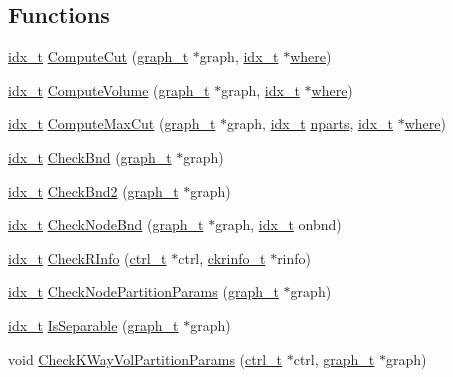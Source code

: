 \subsection*{Functions}
\begin{DoxyCompactItemize}
\item 
\hyperlink{a00876_aaa5262be3e700770163401acb0150f52}{idx\+\_\+t} \hyperlink{a00882_a99abc93df5d5bca5819ed55a767c4e0e}{Compute\+Cut} (\hyperlink{a00734}{graph\+\_\+t} $\ast$graph, \hyperlink{a00876_aaa5262be3e700770163401acb0150f52}{idx\+\_\+t} $\ast$\hyperlink{a00879_a7a355801f721e9d8d4ae03590a3a56b0}{where})
\item 
\hyperlink{a00876_aaa5262be3e700770163401acb0150f52}{idx\+\_\+t} \hyperlink{a00882_aedd132a5a97a0887c9ce0513ad903a7d}{Compute\+Volume} (\hyperlink{a00734}{graph\+\_\+t} $\ast$graph, \hyperlink{a00876_aaa5262be3e700770163401acb0150f52}{idx\+\_\+t} $\ast$\hyperlink{a00879_a7a355801f721e9d8d4ae03590a3a56b0}{where})
\item 
\hyperlink{a00876_aaa5262be3e700770163401acb0150f52}{idx\+\_\+t} \hyperlink{a00882_a2c579207b8d0c26ec7e5bebbdceaa73d}{Compute\+Max\+Cut} (\hyperlink{a00734}{graph\+\_\+t} $\ast$graph, \hyperlink{a00876_aaa5262be3e700770163401acb0150f52}{idx\+\_\+t} \hyperlink{a00879_aad88065af88fd6759101788a8e15ce9e}{nparts}, \hyperlink{a00876_aaa5262be3e700770163401acb0150f52}{idx\+\_\+t} $\ast$\hyperlink{a00879_a7a355801f721e9d8d4ae03590a3a56b0}{where})
\item 
\hyperlink{a00876_aaa5262be3e700770163401acb0150f52}{idx\+\_\+t} \hyperlink{a00882_addb0519d730bbc2793667e245d7de9b4}{Check\+Bnd} (\hyperlink{a00734}{graph\+\_\+t} $\ast$graph)
\item 
\hyperlink{a00876_aaa5262be3e700770163401acb0150f52}{idx\+\_\+t} \hyperlink{a00882_ad8de8465eafe229cfa7f0f51fd9d693f}{Check\+Bnd2} (\hyperlink{a00734}{graph\+\_\+t} $\ast$graph)
\item 
\hyperlink{a00876_aaa5262be3e700770163401acb0150f52}{idx\+\_\+t} \hyperlink{a00882_a1dc55b7020a40a70e39a3e179055c04f}{Check\+Node\+Bnd} (\hyperlink{a00734}{graph\+\_\+t} $\ast$graph, \hyperlink{a00876_aaa5262be3e700770163401acb0150f52}{idx\+\_\+t} onbnd)
\item 
\hyperlink{a00876_aaa5262be3e700770163401acb0150f52}{idx\+\_\+t} \hyperlink{a00882_adb0cfc48ae3464b6fab963903edc0420}{Check\+R\+Info} (\hyperlink{a00742}{ctrl\+\_\+t} $\ast$ctrl, \hyperlink{a00718}{ckrinfo\+\_\+t} $\ast$rinfo)
\item 
\hyperlink{a00876_aaa5262be3e700770163401acb0150f52}{idx\+\_\+t} \hyperlink{a00882_a519cbaf8cac5493b2b1ef28e595ac7b7}{Check\+Node\+Partition\+Params} (\hyperlink{a00734}{graph\+\_\+t} $\ast$graph)
\item 
\hyperlink{a00876_aaa5262be3e700770163401acb0150f52}{idx\+\_\+t} \hyperlink{a00882_a0c608cde251a2992569a84c4dd448422}{Is\+Separable} (\hyperlink{a00734}{graph\+\_\+t} $\ast$graph)
\item 
void \hyperlink{a00882_a70f506aae12b862f495f3dec9a8f4fc3}{Check\+K\+Way\+Vol\+Partition\+Params} (\hyperlink{a00742}{ctrl\+\_\+t} $\ast$ctrl, \hyperlink{a00734}{graph\+\_\+t} $\ast$graph)
\end{DoxyCompactItemize}



